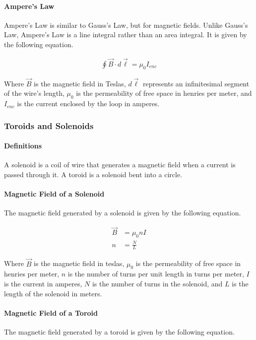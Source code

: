 \paragraph*{Ampere's Law}
Ampere's Law is similar to Gauss's Law, but for magnetic fields. Unlike Gauss's Law, Ampere's Law is a line integral rather than an area integral. 
It is given by the following equation.

\begin{align*}
    \oint \vec{B} \cdot d\vec{\ell} = \mu_0 I_{enc}
\end{align*}

Where $\vec{B}$ is the magnetic field in Teslas, $d\vec{\ell}$ represents an infinitesimal segment of the wire's length, $\mu_0$ is the 
permeability of free space in henries per meter, and $I_{enc}$ is the current enclosed by the loop in amperes.\\

\subsubsection*{Toroids and Solenoids}
\paragraph*{Definitions}
A solenoid is a coil of wire that generates a magnetic field when a current is passed through it. A toroid is a solenoid bent into a circle. 

\paragraph*{Magnetic Field of a Solenoid}
The magnetic field generated by a solenoid is given by the following equation.

\begin{align*}
    \vec{B} &= \mu_0 nI\\
    n &= \frac{N}{L}
\end{align*}

Where $\vec{B}$ is the magnetic field in teslas, $\mu_0$ is the permeability of free space in henries per meter, $n$ is the number of turns per
unit length in turns per meter, $I$ is the current in amperes, $N$ is the number of turns in the solenoid, and $L$ is the length of the solenoid in meters.\\

\paragraph*{Magnetic Field of a Toroid}
The magnetic field generated by a toroid is given by the following equation.


